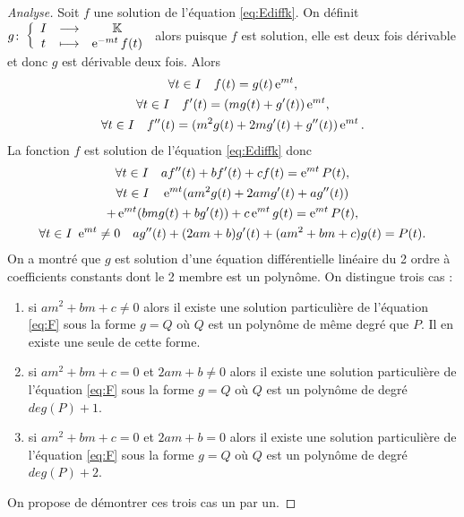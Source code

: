 \begin{proof}[Analyse]
Soit  $f$ une solution de l'équation \eqref{eq:Ediffk}. On définit $g\colon \left\{\begin{array}{ccc} I & \longrightarrow &\mathbb{K}\\ t & \longmapsto & \operatorname{e}^{-mt}f(t) \end{array} \right.$ alors puisque $f$ est solution, elle est deux fois dérivable et donc $g$ est dérivable deux fois. Alors 
\begin{gather}
  \forall t \in I \quad f(t)=g(t)\operatorname{e}^{mt}, \\ 
  \forall t \in I \quad f'(t)= (mg(t)+g'(t))\operatorname{e}^{mt}, \\
  \forall t \in I \quad f''(t)=(m^2g(t)+2mg'(t)+g''(t))\operatorname{e}^{mt}.
\end{gather}
La fonction $f$ est solution de l'équation \eqref{eq:Ediffk} donc 
\begin{gather}
  \forall t \in I \quad af''(t)+bf'(t)+cf(t)=\operatorname{e}^{mt} P(t), \\
  \forall t \in I \quad  \operatorname{e}^{mt}(am^2g(t)+2amg'(t)+ag''(t))  \notag \\ +\operatorname{e}^{mt}(bmg(t)+bg'(t))+c\operatorname{e}^{mt}g(t)=\operatorname{e}^{mt}P(t), \\
  \forall t \in I \ \operatorname{e}^{mt} \neq 0  \quad  ag''(t)+(2am+b)g'(t) +(am^2+bm+c)g(t)=P(t). \label{eq:F}
\end{gather}
On a montré que $g$ est solution d'une équation différentielle linéaire du 2 ordre à coefficients constants dont le 2 membre est un polynôme. On distingue trois cas :
\begin{enumerate}
\item si $am^2+bm+c \neq 0$ alors il existe une solution particulière de l'équation \eqref{eq:F} sous la forme $g=Q$ où $Q$ est un polynôme de même degré que $P$. Il en existe une seule de cette forme.
\item si $am^2+bm+c=0$ et $2am+b \neq 0$ alors il existe une solution particulière de l'équation \eqref{eq:F} sous la forme $g=Q$ où $Q$ est un polynôme de degré $deg(P)+1$.
\item si  $am^2+bm+c=0$ et $2am+b = 0$ alors il existe une solution particulière de l'équation \eqref{eq:F} sous la forme $g=Q$ où $Q$ est un polynôme de degré $deg(P)+2$.
\end{enumerate}
On propose de démontrer ces trois cas un par un.


\end{proof}
